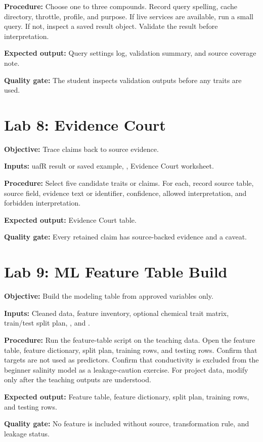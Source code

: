 \textbf{Procedure:} Choose one to three compounds. Record query spelling, cache directory, throttle, profile, and purpose. If live services are available, run a small query. If not, inspect a saved result object. Validate the result before interpretation.

\textbf{Expected output:} Query settings log, validation summary, and source coverage note.

\textbf{Quality gate:} The student inspects validation outputs before any traits are used.

\section{Lab 8: Evidence Court}
\textbf{Objective:} Trace claims back to source evidence.

\textbf{Inputs:} uafR result or saved example, , Evidence Court worksheet.

\textbf{Procedure:} Select five candidate traits or claims. For each, record source table, source field, evidence text or identifier, confidence, allowed interpretation, and forbidden interpretation.

\textbf{Expected output:} Evidence Court table.

\textbf{Quality gate:} Every retained claim has source-backed evidence and a caveat.

\section{Lab 9: ML Feature Table Build}
\textbf{Objective:} Build the modeling table from approved variables only.

\textbf{Inputs:} Cleaned data, feature inventory, optional chemical trait matrix, train/test split plan, , and .

\textbf{Procedure:} Run the feature-table script on the teaching data. Open the feature table, feature dictionary, split plan, training rows, and testing rows. Confirm that targets are not used as predictors. Confirm that conductivity is excluded from the beginner salinity model as a leakage-caution exercise. For project data, modify only after the teaching outputs are understood.

\textbf{Expected output:} Feature table, feature dictionary, split plan, training rows, and testing rows.

\textbf{Quality gate:} No feature is included without source, transformation rule, and leakage status.

